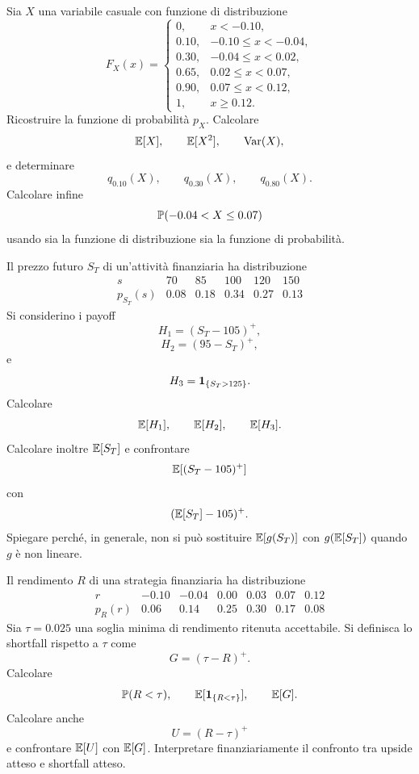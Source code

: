 \begin{exercise}
\label{ex:cap2-prop-cdf-gradini}
\par\smallskip

Sia $X$ una variabile casuale con funzione di distribuzione
\[
F_X(x)=
\begin{cases}
0, & x<-0.10,\\
0.10, & -0.10\leq x<-0.04,\\
0.30, & -0.04\leq x<0.02,\\
0.65, & 0.02\leq x<0.07,\\
0.90, & 0.07\leq x<0.12,\\
1, & x\geq 0.12.
\end{cases}
\]
Ricostruire la funzione di probabilit\`{a} $p_X$. Calcolare
\[
\mathbb{E}[X],
\qquad
\mathbb{E}[X^2],
\qquad
\operatorname{Var}(X),
\]
e determinare
\[
q_{0.10}(X),
\qquad
q_{0.30}(X),
\qquad
q_{0.80}(X).
\]
Calcolare infine
\[
\mathbb{P}(-0.04<X\leq 0.07)
\]
usando sia la funzione di distribuzione sia la funzione di probabilit\`{a}.

\end{exercise}

\begin{exercise}
\label{ex:cap2-prop-payoff-opzioni-indicatrici}

Il prezzo futuro $S_T$ di un'attivit\`{a} finanziaria ha distribuzione
\[
\begin{array}{c|ccccc}
s & 70 & 85 & 100 & 120 & 150\\
\hline
p_{S_T}(s) & 0.08 & 0.18 & 0.34 & 0.27 & 0.13
\end{array}
\]
Si considerino i payoff
\[
H_1=(S_T-105)^+,
\]
\[
H_2=(95-S_T)^+,
\]
e
\[
H_3=\mathbf{1}_{\{S_T>125\}}.
\]
Calcolare
\[
\mathbb{E}[H_1],
\qquad
\mathbb{E}[H_2],
\qquad
\mathbb{E}[H_3].
\]
Calcolare inoltre $\mathbb{E}[S_T]$ e confrontare
\[
\mathbb{E}[(S_T-105)^+]
\]
con
\[
(\mathbb{E}[S_T]-105)^+.
\]
Spiegare perch\'{e}, in generale, non si pu\`{o} sostituire
$\mathbb{E}[g(S_T)]$ con $g(\mathbb{E}[S_T])$ quando $g$ \`{e} non lineare.

\end{exercise}

\begin{exercise}
\label{ex:cap2-prop-shortfall-soglia}

Il rendimento $R$ di una strategia finanziaria ha distribuzione
\[
\begin{array}{c|cccccc}
r & -0.10 & -0.04 & 0.00 & 0.03 & 0.07 & 0.12\\
\hline
p_R(r) & 0.06 & 0.14 & 0.25 & 0.30 & 0.17 & 0.08
\end{array}
\]
Sia $\tau=0.025$ una soglia minima di rendimento ritenuta accettabile. Si
definisca lo shortfall rispetto a $\tau$ come
\[
G=(\tau-R)^+.
\]
Calcolare
\[
\mathbb{P}(R<\tau),
\qquad
\mathbb{E}[\mathbf{1}_{\{R<\tau\}}],
\qquad
\mathbb{E}[G].
\]
Calcolare anche
\[
U=(R-\tau)^+
\]
e confrontare $\mathbb{E}[U]$ con $\mathbb{E}[G]$. Interpretare finanziariamente il confronto tra
upside atteso e shortfall atteso.

\end{exercise}

